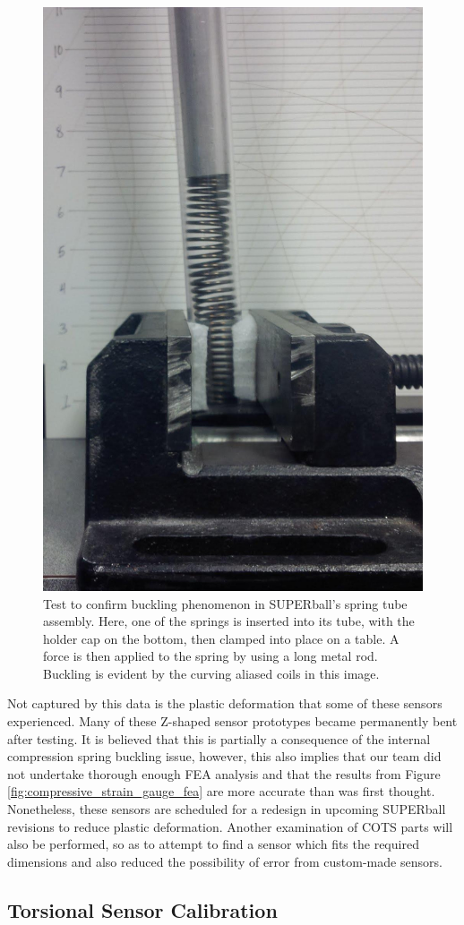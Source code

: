 \documentclass[12pt]{report}
\begin{document}
\begin{figure}[thpb]
      \centering
      \includegraphics[width=.5\columnwidth]{img/spring_buckling_cropped.jpg}
      \caption{Test to confirm buckling phenomenon in SUPERball's spring tube assembly. Here, one of the springs is inserted into its tube, with the holder cap on the bottom, then clamped into place on a table. A force is then applied to the spring by using a long metal rod. Buckling is evident by the curving aliased coils in this image.}
      \label{fig:spring_buckling}
      \vspace{-0.2cm}
\end{figure}

Not captured by this data is the plastic deformation that some of these sensors experienced.
Many of these Z-shaped sensor prototypes became permanently bent after testing.
It is believed that this is partially a consequence of the internal compression spring buckling issue, however, this also implies that our team did not undertake thorough enough FEA analysis and that the results from Figure \ref{fig:compressive_strain_gauge_fea} are more accurate than was first thought.
Nonetheless, these sensors are scheduled for a redesign in upcoming SUPERball revisions to reduce plastic deformation.
Another examination of COTS parts will also be performed, so as to attempt to find a sensor which fits the required dimensions and also reduced the possibility of error from custom-made sensors.

\subsection{Torsional Sensor Calibration}
\end{document}
